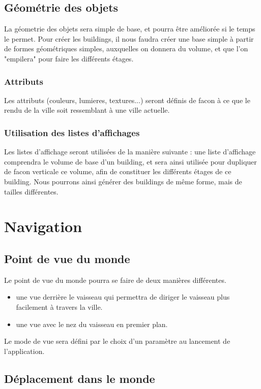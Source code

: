 \documentclass[a4paper,12pt]{article}
\begin{document}
\subsection{Géométrie des objets}
La géometrie des objets sera simple de base, et pourra être améliorée si le temps le permet. Pour créer les buildings, il nous faudra créer une base simple à partir de formes géométriques simples, auxquelles on donnera du volume, et que l'on "empilera" pour faire les différents étages.

\subsubsection{Attributs}
Les attributs (couleurs, lumieres, textures...) seront définis de facon à ce que le rendu de la ville soit ressemblant à une ville actuelle. 

\subsubsection{Utilisation des listes d'affichages}

Les listes d'affichage seront utilisées de la manière suivante : 
    une liste d'affichage comprendra le volume de base d'un building, et sera ainsi utilisée pour dupliquer de facon verticale ce volume, afin de constituer les différents étages de ce building.  Nous pourrons ainsi générer des buildings de même forme, mais de tailles différentes. 
\section{Navigation}

\subsection{Point de vue du monde}
Le point de vue du monde pourra se faire de deux manières différentes.

\begin{itemize}
\item une vue derrière le vaisseau qui permettra de diriger le vaisseau plus facilement à travers la ville.
\item une vue avec le nez du vaisseau en premier plan.
\end{itemize}

Le mode de vue sera défini par le choix d'un paramètre au lancement de l'application.

\subsection{Déplacement dans le monde}
    
\end{document}
